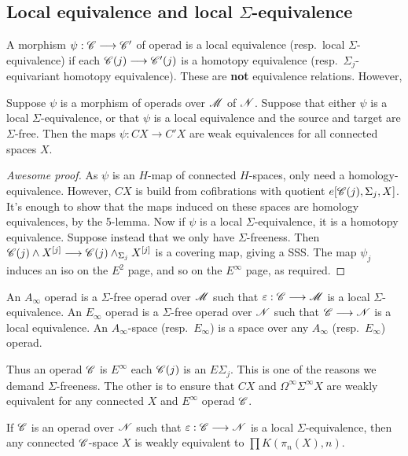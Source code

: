 \documentclass[11pt]{article}
\begin{document}
\begin{chapter1-3}
\subsection*{Local equivalence and local \texorpdfstring{$\Sigma$}{Sigma}-equivalence}
A morphism $\psi:\mathscr{C}\longrightarrow\mathscr{C}'$ of operad is a local equivalence (resp.\ local $\Sigma$-equivalence)  if
each $\mathscr{C}(j)\longrightarrow\mathscr{C}'(j)$ is a homotopy equivalence (resp.\ $\Sigma_j$-equivariant homotopy equivalence).
These are \textbf{not} equivalence relations. However,
\begin{prop*}[3.4]
Suppose $\psi$ is a morphism of operads over $\mathscr{M}$ of $\mathscr{N}$. Suppose that
either $\psi$ is a local $\Sigma$-equivalence, or that $\psi$ is a local
equivalence and the source and target are $\Sigma$-free. Then the maps
$\psi:CX\to C'X$ are weak equivalences for all connected spaces $X$.
\end{prop*}
\begin{proof}[Awesome proof]
As $\psi$ is an $H$-map of connected $H$-spaces, only need a homology-equivalence.
However, $CX$ is build from cofibrations with quotient $e[\mathscr{C}(j),\Sigma_j,X]$.
It's enough to show that the maps induced on these spaces are homology
equivalences, by the 5-lemma. Now if $\psi$ is a local $\Sigma$-equivalence, 
it is a homotopy equivalence. Suppose instead that we only have $\Sigma$-freeness.
Then $\mathscr{C}(j)\wedge X^{[j]}\longrightarrow\mathscr{C}(j)\wedge_{\Sigma_j} X^{[j]}$ is a covering
map, giving a SSS. The map $\psi_j$ induces an iso on the $E^2$ page, and so
on the $E^\infty$ page, as required.
\end{proof}
\begin{defn*}[3.5]
An $A_\infty$ operad is a $\Sigma$-free operad over $\mathscr{M}$ such that
$\varepsilon:\mathscr{C}\longrightarrow\mathscr{M}$ is a local $\Sigma$-equivalence.
An $E_\infty$ operad is a $\Sigma$-free operad over $\mathscr{N}$ such that 
$\mathscr{C}\longrightarrow\mathscr{N}$ is a local equivalence.
 An $A_\infty$-space 
(resp.\ $E_\infty$) is a space over any $A_\infty$ (resp.\ $E_\infty$) operad.
\end{defn*}\noindent
Thus an operad $\mathscr{C}$ is $E^\infty$ \Iff each $\mathscr{C}(j)$ is an $E\Sigma_j$. 
This is one of the reasons we demand $\Sigma$-freeness. The other is to ensure
that $CX$ and $\Omega^\infty\Sigma^\infty X$ are weakly equivalent for any
connected $X$ and $E^\infty$ operad $\mathscr{C}$.
\begin{prop*}[3.6]
If $\mathscr{C}$ is an operad over $\mathscr{N}$ such that $\varepsilon:\mathscr{C}\longrightarrow\mathscr{N}$ is a local
$\Sigma$-equivalence, then any connected $\mathscr{C}$-space $X$ is weakly equivalent
to $\prod K(\pi_n(X),n)$.

\end{prop*}
\end{chapter1-3}
\end{document}
